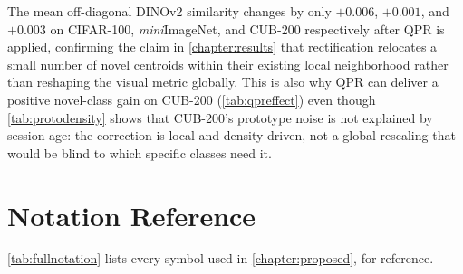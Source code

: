 \documentclass{iutbscthesis}
\begin{document}
\begin{appendices}
The mean off-diagonal DINOv2 similarity changes by only $+0.006$, $+0.001$, and $+0.003$ on CIFAR-100, \emph{mini}ImageNet, and CUB-200 respectively after QPR is applied, confirming the claim in \autoref{chapter:results} that rectification relocates a small number of novel centroids within their existing local neighborhood rather than reshaping the visual metric globally. This is also why QPR can deliver a positive novel-class gain on CUB-200 (\autoref{tab:qpreffect}) even though \autoref{tab:protodensity} shows that CUB-200's prototype noise is not explained by session age: the correction is local and density-driven, not a global rescaling that would be blind to which specific classes need it.

\chapter{Notation Reference}
\label{appendix:notation}

\autoref{tab:fullnotation} lists every symbol used in \autoref{chapter:proposed}, for reference.


\end{appendices}
\end{document}
